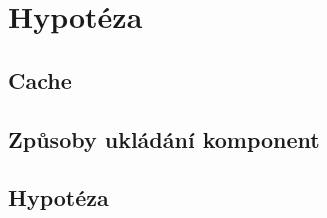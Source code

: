 \chapter{Hypotéza}
\label{chap:hypothesis}

\section{Cache}

\section{Způsoby ukládání komponent}

\section{Hypotéza}






